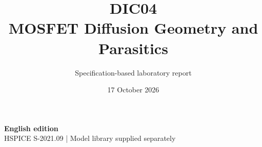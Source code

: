 \documentclass[11pt,a4paper]{article}
\title{\color{accent}DIC04\\[4pt]MOSFET Diffusion Geometry and Parasitics}
\author{Specification-based laboratory report}
\date{17 October 2026}
\begin{document}
\maketitle
\begin{center}\small\textbf{English edition}\\
HSPICE S-2021.09 \quad | \quad Model library supplied separately
\end{center}


\end{document}
